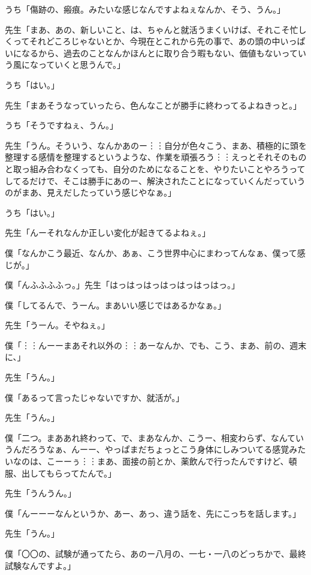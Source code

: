 \documentclass[b5j,twoside,twocolumn]{utarticle}
\begin{document}
\begin{description}
\item うち「傷跡の、瘢痕。みたいな感じなんですよねぇなんか、そう、うん。」
\item 先生「まあ、あの、新しいこと、は、ちゃんと就活うまくいけば、それこそ忙しくってそれどころじゃないとか、今現在とこれから先の事で、あの頭の中いっぱいになるから、過去のことなんかほんとに取り合う暇もない、価値もないっていう風になっていくと思うんで。」
\item うち「はい。」
\item 先生「まあそうなっていったら、色んなことが勝手に終わってるよねきっと。」
\item うち「そうですねぇ、うん。」
\item 先生「うん。そういう、なんかあのー︙︙自分が色々こう、まあ、積極的に頭を整理する感情を整理するというような、作業を頑張ろう︙︙えっとそれそのものと取っ組み合わなくっても、自分のためになることを、やりたいことやろうってしてるだけで、そこは勝手にあのー、解決されたことになっていくんだっていうのがまあ、見えだしたっていう感じやなぁ。」
\item うち「はい。」
\item 先生「んーそれなんか正しい変化が起きてるよねぇ。」
\item 僕「なんかこう最近、なんか、あぁ、こう世界中心にまわってんなぁ、僕って感じが。」
\item 僕「んふふふふっ。」先生「はっはっはっはっはっはっはっ。」
\item 僕「してるんで、うーん。まあいい感じではあるかなぁ。」
\item 先生「うーん。そやねぇ。」
\item 僕「︙︙んーーまあそれ以外の︙︙あーなんか、でも、こう、まあ、前の、週末に、」
\item 先生「うん。」
\item 僕「あるって言ったじゃないですか、就活が。」
\item 先生「うん。」
\item 僕「二つ。まああれ終わって、で、まあなんか、こうー、相変わらず、なんていうんだろうなぁ、んーー、やっぱまだちょっとこう身体にしみついてる感覚みたいなのは、こーーぅ︙︙まあ、面接の前とか、薬飲んで行ったんですけど、頓服、出してもらってたんで。」
\item 先生「うんうん。」
\item 僕「んーーーなんというか、あー、あっ、違う話を、先にこっちを話します。」
\item 先生「うん。」
\item 僕「〇〇の、試験が通ってたら、あのー八月の、一七・一八のどっちかで、最終試験なんですよ。」

\end{description}
\end{document}
